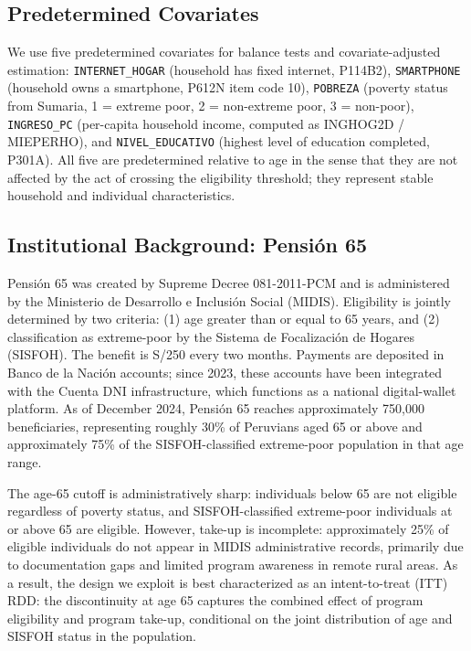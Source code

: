 \documentclass[12pt]{article}
\begin{document}
\subsection{Predetermined Covariates}

We use five predetermined covariates for balance tests and covariate-adjusted estimation: \texttt{INTERNET\_HOGAR} (household has fixed internet, P114B2), \texttt{SMARTPHONE} (household owns a smartphone, P612N item code 10), \texttt{POBREZA} (poverty status from Sumaria, 1 = extreme poor, 2 = non-extreme poor, 3 = non-poor), \texttt{INGRESO\_PC} (per-capita household income, computed as INGHOG2D / MIEPERHO), and \texttt{NIVEL\_EDUCATIVO} (highest level of education completed, P301A). All five are predetermined relative to age in the sense that they are not affected by the act of crossing the eligibility threshold; they represent stable household and individual characteristics.

\subsection{Institutional Background: Pensi\'on 65}

Pensi\'on 65 was created by Supreme Decree 081-2011-PCM and is administered by the Ministerio de Desarrollo e Inclusi\'on Social (MIDIS). Eligibility is jointly determined by two criteria: (1) age greater than or equal to 65 years, and (2) classification as extreme-poor by the Sistema de Focalizaci\'on de Hogares (SISFOH). The benefit is S/250 every two months. Payments are deposited in Banco de la Naci\'on accounts; since 2023, these accounts have been integrated with the Cuenta DNI infrastructure, which functions as a national digital-wallet platform. As of December 2024, Pensi\'on 65 reaches approximately 750,000 beneficiaries, representing roughly 30\% of Peruvians aged 65 or above and approximately 75\% of the SISFOH-classified extreme-poor population in that age range.

The age-65 cutoff is administratively sharp: individuals below 65 are not eligible regardless of poverty status, and SISFOH-classified extreme-poor individuals at or above 65 are eligible. However, take-up is incomplete: approximately 25\% of eligible individuals do not appear in MIDIS administrative records, primarily due to documentation gaps and limited program awareness in remote rural areas. As a result, the design we exploit is best characterized as an intent-to-treat (ITT) RDD: the discontinuity at age 65 captures the combined effect of program eligibility and program take-up, conditional on the joint distribution of age and SISFOH status in the population.
\end{document}
